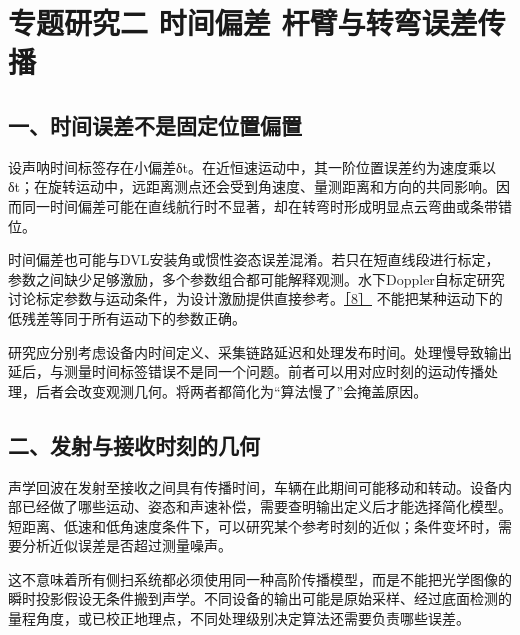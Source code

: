 \hypertarget{ux4e13ux9898ux7814ux7a76ux4e8c-ux65f6ux95f4ux504fux5dee-ux6746ux81c2ux4e0eux8f6cux5f2fux8befux5deeux4f20ux64ad}{%
\section{专题研究二 时间偏差 杆臂与转弯误差传播}\label{ux4e13ux9898ux7814ux7a76ux4e8c-ux65f6ux95f4ux504fux5dee-ux6746ux81c2ux4e0eux8f6cux5f2fux8befux5deeux4f20ux64ad}}

\hypertarget{ux4e00ux65f6ux95f4ux8befux5deeux4e0dux662fux56faux5b9aux4f4dux7f6eux504fux7f6e}{%
\subsection{一、时间误差不是固定位置偏置}\label{ux4e00ux65f6ux95f4ux8befux5deeux4e0dux662fux56faux5b9aux4f4dux7f6eux504fux7f6e}}

设声呐时间标签存在小偏差δt。在近恒速运动中，其一阶位置误差约为速度乘以δt；在旋转运动中，远距离测点还会受到角速度、量测距离和方向的共同影响。因而同一时间偏差可能在直线航行时不显著，却在转弯时形成明显点云弯曲或条带错位。

时间偏差也可能与DVL安装角或惯性姿态误差混淆。若只在短直线段进行标定，参数之间缺少足够激励，多个参数组合都可能解释观测。水下Doppler自标定研究讨论标定参数与运动条件，为设计激励提供直接参考。\href{https://arxiv.org/abs/1509.02054}{［8］} 不能把某种运动下的低残差等同于所有运动下的参数正确。

研究应分别考虑设备内时间定义、采集链路延迟和处理发布时间。处理慢导致输出延后，与测量时间标签错误不是同一个问题。前者可以用对应时刻的运动传播处理，后者会改变观测几何。将两者都简化为``算法慢了''会掩盖原因。

\hypertarget{ux4e8cux53d1ux5c04ux4e0eux63a5ux6536ux65f6ux523bux7684ux51e0ux4f55}{%
\subsection{二、发射与接收时刻的几何}\label{ux4e8cux53d1ux5c04ux4e0eux63a5ux6536ux65f6ux523bux7684ux51e0ux4f55}}

声学回波在发射至接收之间具有传播时间，车辆在此期间可能移动和转动。设备内部已经做了哪些运动、姿态和声速补偿，需要查明输出定义后才能选择简化模型。短距离、低速和低角速度条件下，可以研究某个参考时刻的近似；条件变坏时，需要分析近似误差是否超过测量噪声。

这不意味着所有侧扫系统都必须使用同一种高阶传播模型，而是不能把光学图像的瞬时投影假设无条件搬到声学。不同设备的输出可能是原始采样、经过底面检测的量程角度，或已校正地理点，不同处理级别决定算法还需要负责哪些误差。

